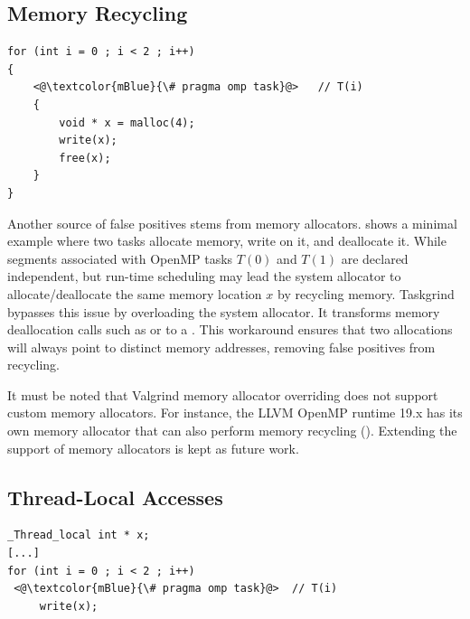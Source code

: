 \subsection{Memory Recycling}

\begin{lstlisting}[style=CStyle, captionpos=b, caption={Memory Recycling false-positives}, label={lst:memory-recycling-false-positive}]
for (int i = 0 ; i < 2 ; i++)
{
	<@\textcolor{mBlue}{\# pragma omp task}@>	// T(i)
	{
		void * x = malloc(4);
		write(x);
		free(x);
	}
}
\end{lstlisting}

Another source of false positives stems from memory allocators.
 shows a minimal example where two tasks allocate memory, write on it, and deallocate it.
While segments associated with OpenMP tasks $T(0)$ and $T(1)$ are declared independent, but run-time scheduling may lead the system allocator to allocate/deallocate the same memory location $x$ by recycling memory.
Taskgrind bypasses this issue by overloading the system allocator.
It transforms memory deallocation calls such as  or  to a .
This workaround ensures that two allocations will always point to distinct memory addresses, removing false positives from recycling.

It must be noted that Valgrind memory allocator overriding does not support custom memory allocators.
For instance, the LLVM OpenMP runtime 19.x has its own memory allocator that can also perform memory recycling ().
Extending the support of memory allocators is kept as future work.

\subsection{Thread-Local Accesses}

\begin{lstlisting}[style=CStyle, captionpos=b, caption={Memory Recycling false-positives}, label={lst:thread-local-false-positive}]
_Thread_local int * x;
[...]
for (int i = 0 ; i < 2 ; i++)
 <@\textcolor{mBlue}{\# pragma omp task}@>	// T(i)
     write(x);
\end{lstlisting}

